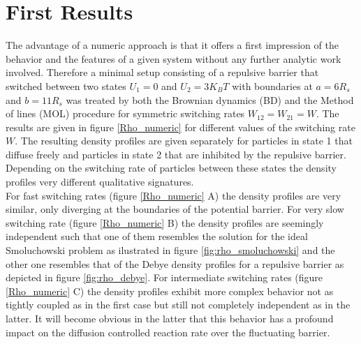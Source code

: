 \section{First Results}
The advantage of a numeric approach is that it offers a first impression of the behavior and the features of a given system without any further analytic work involved. Therefore a minimal setup consisting of a repulsive barrier that switched between two states $U_1 = 0$ and $U_2 = 3 K_B T$ with boundaries at $a = 6 R_s$ and $b = 11 R_s$ was treated by both the Brownian dynamics (BD) and the Method of lines (MOL) procedure for symmetric switching rates $W_{12} = W_{21} = W$. The results are given in figure \ref{Rho_numeric} for different values of the switching rate $W$. The resulting density profiles are given separately for particles in state 1 that diffuse freely and particles in state 2 that are inhibited by the repulsive barrier. Depending on the switching rate of particles between these states the density profiles very different qualitative signatures.\\
For fast switching rates  (figure \ref{Rho_numeric} A) the density profiles are very similar, only diverging at the boundaries of the potential barrier. For very slow switching rate (figure \ref{Rho_numeric} B) the density profiles are seemingly independent such that one of them resembles the solution for the ideal Smoluchowski problem as ilustrated in figure \ref{fig:rho_smoluchowski} and the other one resembles that of the Debye density profiles for a repulsive barrier as depicted in figure \ref{fig:rho_debye}. For intermediate switching rates (figure \ref{Rho_numeric} C) the density profiles exhibit more complex behavior not as tightly coupled as in the first case but still not completely independent as in the latter. It will become obvious in the latter that this behavior has a profound impact on the diffusion controlled reaction rate over the fluctuating barrier.

